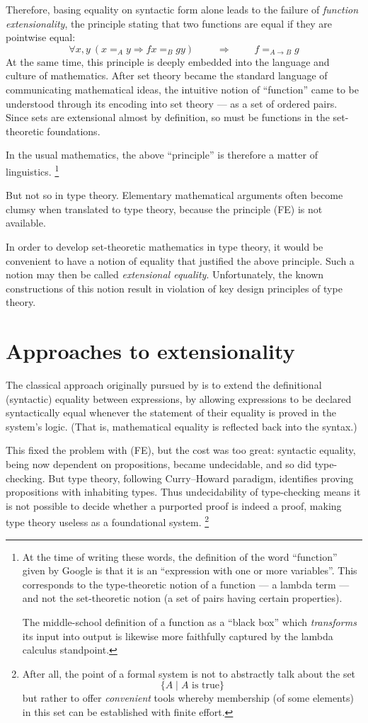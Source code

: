\documentclass[10pt]{article}
\newcommand{\then}{\;\Longrightarrow\;}
\newcommand{\RA}{\Rightarrow}
\newcommand{\setof}[1]{\{{#1}\}}
\begin{document}
Therefore, basing equality on syntactic form alone leads to the
failure of \emph{function extensionality}, the principle stating that
two functions are equal if they are pointwise equal:
\[ \forall x,y\ (x=_A y \RA fx =_B gy)\qquad \then \qquad f=_{A \to B}
g \tag{FE} \]
At the same time, this principle is deeply embedded into the
language and culture of mathematics.  After set theory
became the standard language of 
communicating mathematical ideas, the intuitive notion of ``function''
came to be understood through its encoding into
set theory ---  as a set of ordered pairs.
Since sets are extensional almost by definition, so must be functions in
the set-theoretic foundations.

In the usual mathematics, the above ``principle'' is therefore a
matter of linguistics.
\footnote{At the time of
writing these words, the definition of the word ``function'' given by
Google is that it is an ``expression with one or more variables''.
This corresponds to the type-theoretic notion of a function ---  a lambda term ---
and not the set-theoretic notion (a set of pairs having certain
properties).

The middle-school definition of a function as a ``black box''
which \emph{transforms} its input into output is
likewise more faithfully captured by the lambda calculus standpoint.
}

But not so in type theory. Elementary mathematical arguments often become
clumsy when translated to type theory, because the principle (FE) is
not available.

In order to develop set-theoretic mathematics in type theory,
it would be convenient to have a notion of equality that
justified the above principle.  Such a notion may then be called
\emph{extensional equality}.  Unfortunately, the known constructions
of this notion result in violation of key design principles of type theory.

\section{Approaches to extensionality}

The classical approach originally pursued by \cite{itt} is
to extend the definitional (syntactic) equality between expressions,
by allowing expressions to be declared syntactically equal whenever
the statement of their equality is proved in the system's logic.
(That is, mathematical equality is reflected back into the syntax.)

This fixed the problem with (FE), but the cost was too great:
syntactic equality, being now dependent on propositions, became
undecidable, and so did type-checking.  But type theory, following
Curry--Howard paradigm, identifies proving propositions with
inhabiting types.  Thus undecidability of type-checking means it is
not possible to decide whether a purported proof is indeed a proof,
making type theory useless as a foundational system. \footnote{
After all, the point of a formal system is not to abstractly talk
about the set
\[ \setof{A \mid A \text{ is true}} \]
but rather to offer \emph{convenient} tools whereby membership (of some elements)
in this set can be established with finite effort.}
\end{document}
